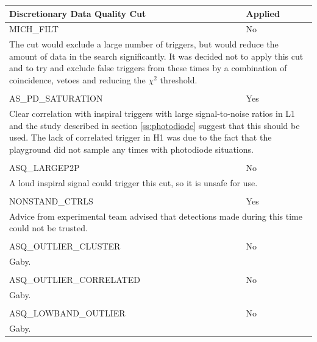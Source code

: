 \begin{table}[p]
\begin{center}
\begin{tabular}{ll}
Discretionary Data Quality Cut  & Applied \\\hline\hline
MICH\_FILT                 & No \\
\multicolumn{2}{l}{\parbox{\linewidth}{\footnotesize The cut would exclude a
large number of triggers, but would reduce the amount of data in the search
significantly. It was decided not to apply this cut and to try and exclude
false triggers from these times by a combination of coincidence, vetoes and
reducing the $\chi^2$ threshold.}}\\
\\
AS\_PD\_SATURATION        & Yes \\
\multicolumn{2}{l}{\parbox{\linewidth}{\footnotesize Clear correlation with
inspiral triggers with large signal-to-noise ratios in L1 and the study
described in section \ref{ss:photodiode} suggest that this should be used. The
lack of correlated trigger in H1 was due to the fact that the playground did
not sample any times with photodiode situations.\baselineskip=14pt}}\\
\\
ASQ\_LARGEP2P             & No \\
\multicolumn{2}{l}{\parbox{\linewidth}{\footnotesize A loud inspiral signal
could trigger this cut, so it is unsafe for use.\baselineskip=14pt}} \\
\\
NONSTAND\_CTRLS           & Yes \\
\multicolumn{2}{l}{\parbox{\linewidth}{\footnotesize Advice from experimental
team advised that detections made during this time could not be
trusted.\baselineskip=14pt}} \\
\\
ASQ\_OUTLIER\_CLUSTER     & No \\
\multicolumn{2}{l}{\parbox{\linewidth}{\footnotesize Gaby.\baselineskip=14pt}} \\
\\
ASQ\_OUTLIER\_CORRELATED  & No \\
\multicolumn{2}{l}{\parbox{\linewidth}{\footnotesize Gaby.\baselineskip=14pt}} \\
\\
ASQ\_LOWBAND\_OUTLIER     & No \\
\multicolumn{2}{l}{\parbox{\linewidth}{\footnotesize Gaby.\baselineskip=14pt}} \\

\end{tabular}
\end{center}
\end{table}
